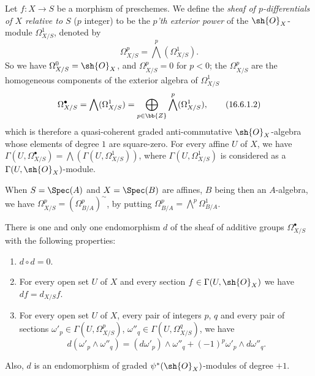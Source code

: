 \begin{env}[16.6.1]
\label{IV.16.6.1}
Let $f:X \to S$ be a morphism of preschemes.
We define the \emph{sheaf of $p$-differentials of $X$ relative to $S$} ($p$ integer) to be the \emph{$p$'th exterior power}  of the $\sh{O}_X$-module $\Omega_{X/S}^1$, denoted by
\[
  \label{IV.16.6.1.1}
  \Omega_{X/S}^p = \bigwedge^p(\Omega_{X/S}^1).
  \tag{16.6.1.1}
\] 
So we have $\Omega_{X/S}^0 = \sh{O}_X$, and $\Omega_{X/S}^p = 0$ for $p < 0$;
the $\Omega_{X/S}^p$ are the homogeneous components of the exterior algebra of $\Omega_{X/S}^1$
\[  
  \label{IV.16.6.1.2}
  \Omega_{X/S}^\bullet = \bigwedge(\Omega_{X/S}^1) = \bigoplus_{p \in \bb{Z}}\bigwedge^p(\Omega_{X/S}^1),  
  \tag{16.6.1.2}
\] 
which is therefore a quasi-coherent graded anti-commutative $\sh{O}_X$-algebra whose elements of degree $1$ are square-zero.
For every affine $U$ of $X$, we have $\Gamma(U, \Omega_{X/S}^\bullet) = \bigwedge (\Gamma(U, \Omega_{X/S}^1))$, where $\Gamma(U, \Omega_{X/S}^1)$ is considered as a $\Gamma(U, \sh{O}_X)$-module.

When $S = \Spec(A)$ and $X = \Spec(B)$ are affines, $B$ being then an $A$-algebra, we have  $\Omega_{X/S}^p = (\Omega_{B/A}^p)^\sim$, by putting $\Omega_{B/A}^p = \bigwedge^p\Omega^1_{B/A}$. 
\end{env}

\begin{theorem}[16.6.2]
\label{IV.16.6.2}
There is one and only one endomorphism $d$ of the sheaf of additive groups $\Omega_{X/S}^\bullet$ with the following properties:
\begin{enumerate}
  \item[\rm{(i)}] $d \circ d = 0$.
  \item[\rm{(ii)}] For every open set $U$ of $X$ and every section $f \in \Gamma(U, \sh{O}_X)$ we have $df = d_{X/S}f$. 
  \item[\rm{(iii)}] For every open set $U$ of $X$, every pair of integers $p$, $q$ and every pair of sections $\omega'_p \in \Gamma(U, \Omega_{X/S}^p)$, $\omega''_q \in \Gamma(U, \Omega_{X/S}^q)$, we have
  \[
    \label{IV.16.6.2.1}
    d(\omega'_p \wedge \omega''_q) = (d\omega'_p) \wedge \omega''_q + (-1)^p \omega'_p \wedge d\omega''_q.
    \tag{16.6.2.1}
  \]
\end{enumerate}
Also, $d$ is an endomorphism of graded $\psi^*(\sh{O}_X)$-modules of degree $+1$.
\end{theorem}

